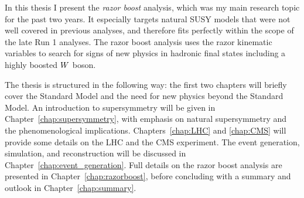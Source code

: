 In this thesis I present the \textit{razor boost} analysis, which was my main research topic for the
past two years. It especially targets natural SUSY models that were not well covered in previous
analyses, and therefore fits perfectly within the scope of the late Run 1 analyses. The razor boost
analysis uses the razor kinematic variables to search for signs of new physics in hadronic final
states including a highly boosted $W$ boson. 

The thesis is structured in the following way: the first two chapters will briefly cover the
Standard Model and the need for new physics beyond the Standard Model. An introduction to
supersymmetry will be given in Chapter~\ref{chap:supersymmetry}, with emphasis on natural
supersymmetry and the phenomenological implications. Chapters~\ref{chap:LHC} and \ref{chap:CMS} will
provide some details on the LHC and the CMS experiment. The event generation, simulation, and
reconstruction will be discussed in Chapter~\ref{chap:event_generation}. Full details on the razor
boost analysis are presented in Chapter~\ref{chap:razorboost}, before concluding with a summary and
outlook in Chapter~\ref{chap:summary}.



